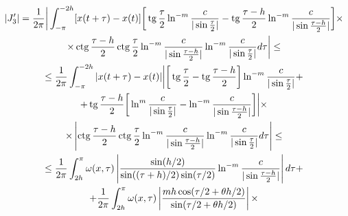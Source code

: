 \begin{multline}


|J_3'| = \frac{1}{2\pi} \bigg| \int_{-\pi}^{-2h}[x(t+\tau) -x(t)]


\bigg[ \tg \frac{\tau}{2} \ln^{-m}\frac{c}{|\sin \frac{\tau}{2}|} -


\tg \frac{\tau-h}{2} \ln^{-m}\frac{c}{|\sin \frac{\tau-h}{2}|}\bigg]\times\\


%


\times \ctg \frac{\tau-h}{2}


\ctg \frac{\tau}{2} \ln^{-m}\frac{c}{|\sin \frac{\tau-h}{2}|}


\ln^{-m}\frac{c}{|\sin \frac{\tau}{2}|} d\tau \bigg| \leq \\


%


\leq \frac{1}{2\pi} \int_{-\pi}^{-2h}|x(t+\tau) -x(t)|


\bigg| \bigg[ \tg \frac{\tau}{2} - \tg \frac{\tau-h}{2} \bigg]


\ln^{-m}\frac{c}{|\sin \frac{\tau}{2}|}+ \\


%


+ \tg \frac{\tau-h}{2} \bigg[


\ln^{m}\frac{c}{|\sin \frac{\tau}{2}|} -


\ln^{-m}\frac {c}{|\sin \frac{\tau-h}{2}|} \bigg]\bigg| \times \\


%


\times\left|\ctg \frac{\tau-h}{2} \ctg


\frac{\tau}{2} \ln^{-m}\frac{c}{|\sin \frac{\tau-h}{2}|}


\ln^{-m}\frac{c}{|\sin \frac{\tau}{2}|} d\tau \right| \leq \\


%


\leq \frac{1}{2\pi} \int_{2h}^{\pi} \omega(x,\tau)


\left| \frac{\sin(h/2)}{\sin((\tau+h)/2) \sin(\tau/2)}


\ln^{-m}\frac{c}{|\sin \frac{\tau-h}{2}|} \right| d\tau + \\


%


+ \frac{1}{2\pi} \int_{2h}^{\pi} \omega(x,\tau)


\left| \frac{mh \cos(\tau /2+ \theta h/2)}{\sin(\tau /2+\theta h/2)} \right|


\times \\



\end{multline}
